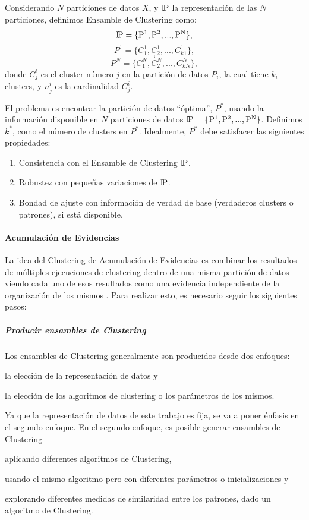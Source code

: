 \bigskip Considerando \(N\) particiones de datos \(X\), y \(\rm I\!P\) la representación de las \(N\) particiones, definimos Ensamble de Clustering como:
\[\rm I\!P = \{P^1, P^2, ..., P^N\},\]
\[P^1 = \{C^1_1, C^1_2, ..., C^1_{k1}\},\]
\[.\]
\[.\]
\[P^N = \{C^N_1, C^N_2, ..., C^N_{kN}\},\]
donde \(C^i_j\) es el cluster número \(j\) en la partición de datos \(P_i\), la cual tiene \(k_i\) clusters, y \(n^i_j\) es la cardinalidad \(C^i_j\).

\bigskip El problema es encontrar la partición de datos “óptima”, \(P^*\), usando la información disponible en \(N\) particiones de datos \(\rm I\!P = \{P^1, P^2, ..., P^N\}\). Definimos \(k^*\), como el número de clusters en \(P^*\). Idealmente, \(P^*\) debe satisfacer las siguientes propiedades:

\begin{enumerate}
	\item Consistencia con el Ensamble de Clustering \(\rm I\!P\).
	\item Robustez con pequeñas variaciones de \(\rm I\!P\).
	\item Bondad de ajuste con información de verdad de base (verdaderos clusters o patrones), si está disponible.
\end{enumerate}

\paragraph{Acumulación de Evidencias}
La idea del Clustering de Acumulación de Evidencias es combinar los resultados de múltiples ejecuciones de clustering dentro de una misma partición de datos viendo cada uno de esos resultados como una evidencia independiente de la organización de los mismos \citep{fred2005combining}. Para realizar esto, es necesario seguir los siguientes pasos:

\subparagraph{Producir ensambles de Clustering}
Los ensambles de Clustering generalmente son producidos desde dos enfoques:
\begin{enumerate*}
	\item la elección de la representación de datos y
	\item la elección de los algoritmos de clustering o los parámetros de los mismos.
\end{enumerate*}
Ya que la representación de datos de este trabajo es fija, se va a poner énfasis en el segundo enfoque. En el segundo enfoque, es posible generar ensambles de Clustering \begin{enumerate*} [label=(\roman*)] \item aplicando diferentes algoritmos de Clustering, \item usando el mismo algoritmo pero con diferentes parámetros o inicializaciones y \item explorando diferentes medidas de similaridad entre los patrones, dado un algoritmo de Clustering.\end{enumerate*}

